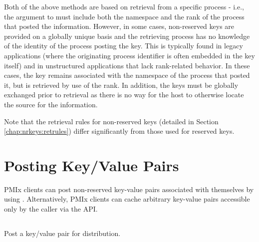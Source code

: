 Both of the above methods are based on retrieval from a specific process -
i.e., the  argument to  must include both the
namespace and the rank of the process that posted the information. However, in
some cases, non-reserved keys are provided on a globally unique basis and the
retrieving process has no knowledge of the identity of the process posting the
key. This is typically found in legacy applications (where the originating
process identifier is often embedded in the key itself) and in unstructured
applications that lack rank-related behavior. In these cases, the key remains
associated with the namespace of the process that posted it, but is retrieved
by use of the  rank. In addition, the keys must be
globally exchanged prior to retrieval as there is no way for the host to
otherwise locate the source for the information.

Note that the retrieval rules for non-reserved keys (detailed in Section \ref{chap:nrkeys:retrules}) differ significantly from those used for reserved keys.


\section{Posting Key/Value Pairs}
\label{chap:api_kv_mgmt:set}

\ac{PMIx} clients can post non-reserved key-value pairs associated with themselves by using . Alternatively, \ac{PMIx} clients can cache arbitrary key-value pairs accessible only by the caller via the  \ac{API}.


\subsection{}

\summary

Post a key/value pair for distribution.

\format


